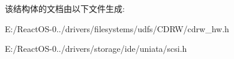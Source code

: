 该结构体的文档由以下文件生成\+:\begin{DoxyCompactItemize}
\item 
E\+:/\+React\+O\+S-\/0../drivers/filesystems/udfs/\+C\+D\+R\+W/cdrw\+\_\+hw.\+h\item 
E\+:/\+React\+O\+S-\/0../drivers/storage/ide/uniata/scsi.\+h\end{DoxyCompactItemize}
